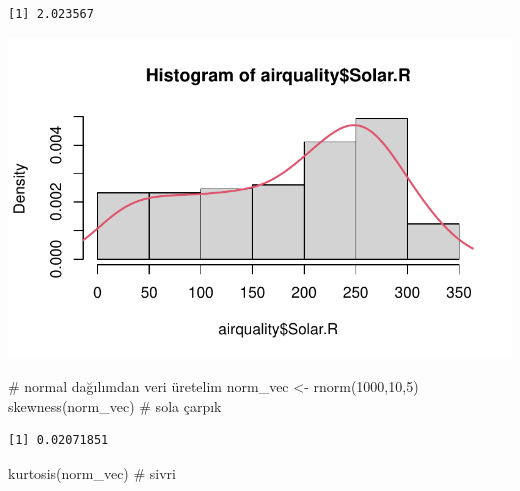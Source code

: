 \documentclass[
  letterpaper,
  DIV=11,
  numbers=noendperiod]{scrreprt}
\newenvironment{Shaded}{\begin{snugshade}}{\end{snugshade}}
\newcommand{\AttributeTok}[1]{\textcolor[rgb]{0.40,0.45,0.13}{#1}}
\newcommand{\CommentTok}[1]{\textcolor[rgb]{0.37,0.37,0.37}{#1}}
\newcommand{\ConstantTok}[1]{\textcolor[rgb]{0.56,0.35,0.01}{#1}}
\newcommand{\DecValTok}[1]{\textcolor[rgb]{0.68,0.00,0.00}{#1}}
\newcommand{\FunctionTok}[1]{\textcolor[rgb]{0.28,0.35,0.67}{#1}}
\newcommand{\NormalTok}[1]{\textcolor[rgb]{0.00,0.23,0.31}{#1}}
\newcommand{\OtherTok}[1]{\textcolor[rgb]{0.00,0.23,0.31}{#1}}
\newcommand{\SpecialCharTok}[1]{\textcolor[rgb]{0.37,0.37,0.37}{#1}}
\begin{document}
\begin{verbatim}
[1] 2.023567
\end{verbatim}

\begin{Shaded}
\end{Shaded}

\includegraphics{statistics_files/figure-pdf/unnamed-chunk-10-2.pdf}

\begin{Shaded}
\begin{Highlighting}[]
\CommentTok{\# normal dağılımdan veri üretelim}
\NormalTok{norm\_vec }\OtherTok{\textless{}{-}} \FunctionTok{rnorm}\NormalTok{(}\DecValTok{1000}\NormalTok{,}\DecValTok{10}\NormalTok{,}\DecValTok{5}\NormalTok{)}
\FunctionTok{skewness}\NormalTok{(norm\_vec) }\CommentTok{\# sola çarpık}
\end{Highlighting}
\end{Shaded}

\begin{verbatim}
[1] 0.02071851
\end{verbatim}

\begin{Shaded}
\begin{Highlighting}[]
\FunctionTok{kurtosis}\NormalTok{(norm\_vec) }\CommentTok{\# sivri}
\end{Highlighting}
\end{Shaded}
\end{document}
